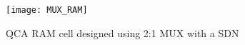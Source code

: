 \begin{figure}
	\centering
	\texttt{[image: MUX\_RAM]}
	
	\caption{QCA RAM cell designed using 2:1 MUX with a SDN}\label{fig:QCA_RAM}
\end{figure}